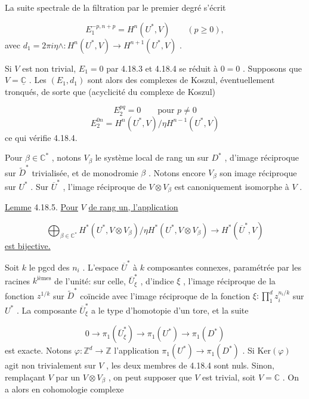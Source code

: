 La suite spectrale de la filtration par le premier degré s'écrit

\begin{equation*}
E_1^{-p,n+p} = H^n(U^*, V) \qquad (p \geqslant 0) ,
\end{equation*}
avec $d_1 = 2\pi i \eta \wedge : H^n(U^*, V) \longrightarrow H^{n+1}(U^*, V)$ .

Si $V$ est non trivial, $E_1 = 0$ par 4.18.3 et 4.18.4 se réduit à $0 = 0$ . Supposons que $V = \underline{\mathbb{C}}$ . Les $(E_1, d_1)$ sont alors des complexes de Koszul, éventuellement tronqués, de sorte que (acyclicité du complexe de Koszul)

\begin{equation*}
E_2^{pq} = 0 \qquad \text{pour } p \neq 0
\end{equation*}
\begin{equation*}
E_2^{0n} = H^n(U^*, V)/\eta H^{n-1}(U^*, V)
\end{equation*}
ce qui vérifie 4.18.4.

Pour $\beta \in \mathbb{C}^*$ , notons $V_\beta$ le système local de rang un sur $D^*$ , d'image réciproque sur $\widetilde{D}^*$ trivialisée, et de monodromie $\beta$ . Notons encore $V_\beta$ son image réciproque sur $U^*$ . Sur $\overline{U}^*$ , l'image réciproque de $V \otimes V_\beta$ est canoniquement isomorphe à $V$ .

\underline{Lemme} 4.18.5. \underline{Pour} $V$ \underline{de rang un, l'application}

\begin{equation*}
\bigoplus_{\beta \in \mathbb{C}^*} H^*(U^*, V \otimes V_\beta)/\eta H^*(U^*, V \otimes V_\beta) \longrightarrow H^*(\overline{U}^*, V)
\end{equation*}
\underline{est bijective.}

Soit $k$ le pgcd des $n_i$ . L'espace $\overline{U}^*$ à $k$ composantes connexes, paramétrée par les racines $k^{\text{ièmes}}$ de l'unité: sur celle, $\overline{U}^*_\xi$ , d'indice $\xi$ , l'image réciproque de la fonction $z^{1/k}$ sur $\widetilde{D}^*$ coïncide avec l'image réciproque de la fonction $\xi : \prod_1^d z_i^{n_i/k}$ sur $U^*$ . La composante $\overline{U}^*_\xi$ a le type d'homotopie d'un tore, et la suite

\begin{equation*}
0 \longrightarrow \pi_1(\overline{U}^*_\xi) \longrightarrow \pi_1(U^*) \longrightarrow \pi_1(D^*)
\end{equation*}
est exacte. Notons $\varphi : \mathbb{Z}^d \to \mathbb{Z}$ l'application $\pi_1(U^*) \to \pi_1(D^*)$ . Si $\mathrm{Ker}(\varphi)$ agit non trivialement sur $V$ , les deux membres de 4.18.4 sont nuls. Sinon, remplaçant $V$ par un $V \otimes V_\beta$ , on peut supposer que $V$ est trivial, soit $V = \mathbb{C}$ . On a alors en cohomologie complexe

